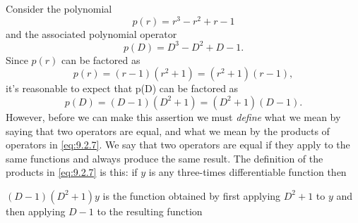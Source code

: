 \setcounter{example}{1}
\setcounter{equation}{6}
\begin{example}
  \label{example:9.2.2} \rm Consider the polynomial
  \[
    p(r)=r^{3}-r^{2}+r-1
  \]
  and the associated polynomial operator
  \[
    p(D)=D^{3}-D^{2}+D-1.
  \]
  Since $p(r)$ can be factored as
  \[
    p(r)=(r-1)(r^{2}+1)=(r^{2}+1)(r-1),
  \]
  it's reasonable to expect that p(D) can be factored as
  \begin{equation}
    \label{eq:9.2.7}p(D)=(D-1)(D^{2}+1)=(D^{2}+1)(D-1).
  \end{equation}
  However, before we can make this assertion we must {\relax\it define\/} what we mean by
  saying that two operators are equal, and what we mean by the products of operators in
  \eqref{eq:9.2.7}. We say that two operators are equal if they apply to the same functions and
  always produce the same result. The definition of the products in \eqref{eq:9.2.7} is this: if
  $y$ is any three-times differentiable function then
  \begin{alist}
    \item %
    $(D-1)(D^{2}+1)y$ is the function obtained by first applying $D^{2}+1$ to $y$ and then applying
    $D-1$ to the resulting function


\end{alist}
\end{example}
